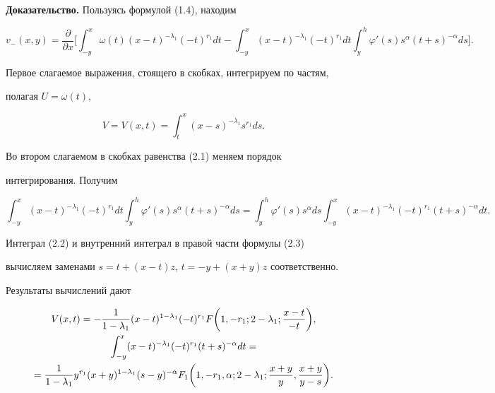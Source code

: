  


{\bf Доказательство.} Пользуясь формулой (1.4), находим 


\begin{equation} 


v_-(x,y)=\frac{\partial}{\partial x}\bigg[\int^x_{-y} 


\omega(t)(x-t)^{-\lambda_1}(-t)^{r_1}d t-\int^x_{-y} 


(x-t)^{-\lambda_1}(-t)^{r_1}d t\int^h_y 


\varphi'(s)s^\alpha(t+s)^{-\alpha}d s\bigg]. 


\end{equation} 


Первое слагаемое выражения, стоящего в скобках, интегрируем по частям, 


полагая $U=\omega(t)$, 


\begin{equation} 


V=V(x,t)=\int^x_t(x-s)^{-\lambda_1}s^{r_1}d s. 


\end{equation} 


 


Во втором слагаемом в скобках равенства (2.1) меняем порядок 


интегрирования. Получим 


\begin{equation} 


\int^x_{-y}(x-t)^{-\lambda_1}(-t)^{r_1}d t\int^h_y 


\varphi'(s)s^\alpha(t+s)^{-\alpha}d s=\int^h_y 


\varphi'(s)s^\alpha d s\int^x_{-y}(x-t)^{-\lambda_1} 


(-t)^{r_1}(t+s)^{-\alpha}d t. 


\end{equation} 


 


Интеграл (2.2) и внутренний интеграл в правой части формулы (2.3) 


вычисляем заменами $s=t+(x-t)z$, $t=-y+(x+y)z$ соответственно. 


Результаты вычислений дают 


\begin{gather} 


V(x,t)=-\frac{1}{1-\lambda_1}(x-t)^{1-\lambda_1}(-t)^{r_1}F\bigg( 


1,-r_1;2-\lambda_1;\frac{x-t}{-t}\bigg),\\ 


% 


\int^x_{-y}(x-t)^{-\lambda_1}(-t)^{r_1}(t+s)^{-\alpha}d t= \notag \\


=\frac{1}{1-\lambda_1}y^{r_1}(x+y)^{1-\lambda_1} 


(s-y)^{-\alpha}F_1\bigg(1,-r_1,\alpha;2-\lambda_1; 


\frac{x+y}{y},\frac{x+y}{y-s}\bigg). 


\end{gather} 


